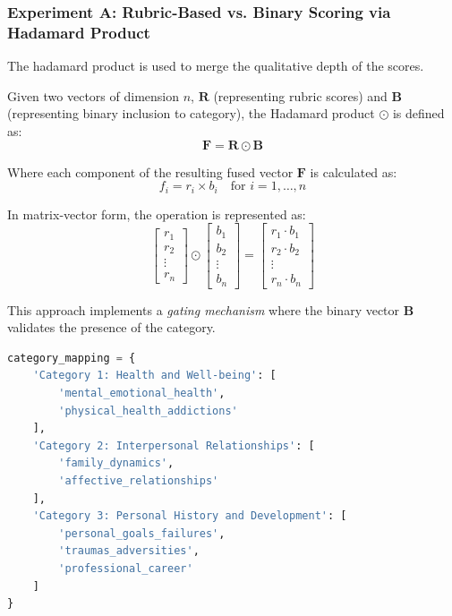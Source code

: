         
        \subsubsection{Experiment A: Rubric-Based vs. Binary Scoring via Hadamard Product}

The hadamard product is used to merge the qualitative depth of the scores.

Given two vectors of dimension $n$, $\mathbf{R}$ (representing rubric scores) and $\mathbf{B}$ (representing binary inclusion to category), the Hadamard product $\odot$ is defined as:
\begin{equation}
    \mathbf{F} = \mathbf{R} \odot \mathbf{B}
\end{equation}

Where each component of the resulting fused vector $\mathbf{F}$ is calculated as:
\begin{equation}
    f_{i} = r_{i} \times b_{i} \quad \text{for  } i = 1, \dots, n
\end{equation}

In matrix-vector form, the operation is represented as:
\begin{equation}
    \begin{bmatrix} r_1 \\ r_2 \\ \vdots \\ r_n \end{bmatrix} \odot \begin{bmatrix} b_1 \\ b_2 \\ \vdots \\ b_n \end{bmatrix} = \begin{bmatrix} r_1 \cdot b_1 \\ r_2 \cdot b_2 \\ \vdots \\ r_n \cdot b_n \end{bmatrix}
\end{equation}

This approach implements a \textit{gating mechanism} where the binary vector $\mathbf{B}$ validates the presence of the category. 

\begin{lstlisting}[language=Python, caption={Mapping of Subtopics to SPT Categories.}, label={lst:mapping_categories}, frame=single, basicstyle=\small\ttfamily]
category_mapping = {
    'Category 1: Health and Well-being': [
        'mental_emotional_health', 
        'physical_health_addictions'
    ],
    'Category 2: Interpersonal Relationships': [
        'family_dynamics', 
        'affective_relationships'
    ],
    'Category 3: Personal History and Development': [
        'personal_goals_failures', 
        'traumas_adversities', 
        'professional_career'
    ]
}
\end{lstlisting}


